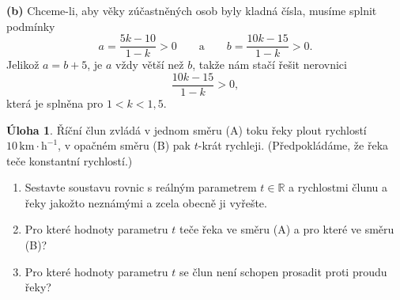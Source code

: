 \documentclass[12pt,a4paper]{article}
\newcommand{\R}{\mathbb{R}}
\theoremstyle{definition}
\newtheorem{uloha}{Úloha}
\newenvironment{res}{\proof}{\endproof}
\begin{document}
\begin{res}
\medskip
\noindent\textbf{(b)} Chceme-li, aby věky zúčastněných osob byly kladná čísla, musíme splnit podmínky
\[ a = \frac{5k - 10}{1 - k} > 0 \qquad \text{a} \qquad b = \frac{10k - 15}{1 - k} > 0. \]
Jelikož $a = b+5$, je $a$ vždy větší než $b$, takže nám stačí řešit nerovnici
\[ \frac{10k - 15}{1 - k} > 0, \]
která je splněna pro $1 < k < 1{,}5$.
\end{res}




\begin{uloha}
Říční člun zvládá v jednom směru (A) toku řeky plout rychlostí $10\,\mathrm{km}\cdot\mathrm{h}^{-1}$, v opačném směru (B) pak $t$-krát rychleji. (Předpokládáme, že řeka teče konstantní rychlostí.)
\begin{enumerate}
	\item Sestavte soustavu rovnic s reálným parametrem $t \in \R$ a rychlostmi člunu a řeky jakožto neznámými a zcela obecně ji vyřešte.
	\item Pro které hodnoty parametru $t$ teče řeka ve směru (A) a pro které ve směru (B)?
	\item Pro které hodnoty parametru $t$ se člun není schopen prosadit proti proudu řeky?
\end{enumerate}
\end{uloha}
\end{document}
